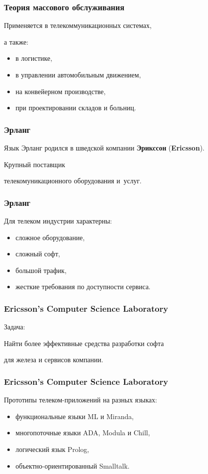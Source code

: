 \documentclass[10pt]{beamer}
\begin{document}
\begin{frame}
  \frametitle{Теория массового обслуживания}
  Применяется в телекоммуникационных системах,
  \par \bigskip
  а также:
  \begin{itemize}
  \item в логистике,
  \item в управлении автомобильным движением,
  \item на конвейерном производстве,
  \item при проектировании складов и больниц.
  \end{itemize}
\end{frame}

\begin{frame}
  \frametitle{Эрланг}
  Язык Эрланг родился в шведской компании \textbf{Эрикссон} (\textbf{Ericsson}).
  \par \bigskip
  Крупный поставщик
  \par \bigskip
  телекомуникационного оборудования и~услуг.
\end{frame}

\begin{frame}
  \frametitle{Эрланг}
  Для телеком индустрии характерны:
  \begin{itemize}
  \item сложное оборудование,
  \item сложный софт,
  \item большой трафик,
  \item жесткие требования по доступности сервиса.
  \end{itemize}
\end{frame}

\begin{frame}
  \frametitle{Ericsson’s Computer Science Laboratory}
  Задача:
  \par \bigskip
  Найти более эффективные средства разработки софта
  \par \bigskip
  для железа и сервисов компании.
\end{frame}

\begin{frame}
  \frametitle{Ericsson’s Computer Science Laboratory}
  Прототипы телеком-приложений на разных языках:
  \begin{itemize}
  \item функциональные языки ML и Miranda,
  \item многопоточные языки ADA, Modula и Chill,
  \item логический язык Prolog,
  \item объектно-ориентированный Smalltalk.
  \end{itemize}
\end{frame}
\end{document}

